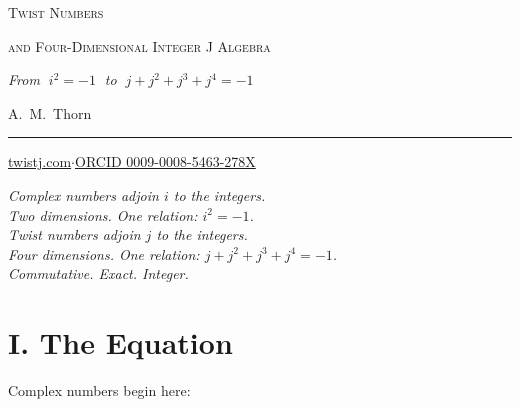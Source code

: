 \documentclass[11pt, a4paper]{article}
\begin{document}
\begin{center}
\vspace*{0.3cm}

{\huge\scshape Twist Numbers}

\vspace{0.2em}

{\LARGE\scshape and Four-Dimensional Integer J Algebra}

\vspace{0.3em}

{\Large\itshape From $\;i^2 = -1\;$ to $\;j + j^2 + j^3 + j^4 = -1$}

\vspace{1em}

{\large A.\ M.\ Thorn}

\vspace{0.5em}

\rule{0.3\textwidth}{0.4pt}

\vspace{0.3em}

{\small \href{https://twistj.com}{twistj.com}\quad$\cdot$\quad \href{https://orcid.org/0009-0008-5463-278X}{ORCID 0009-0008-5463-278X}}

\end{center}

\vspace{0.5em}

\begin{center}
\textit{Complex numbers adjoin $i$ to the integers.}\\[0.2em]
\textit{Two dimensions. One relation: $i^2 = -1$.}\\[0.4em]
\textit{Twist numbers adjoin $j$ to the integers.}\\[0.2em]
\textit{Four dimensions. One relation: $j + j^2 + j^3 + j^4 = -1$.}\\[0.4em]
\textit{Commutative. Exact. Integer.}
\end{center}

\vspace{1em}

\section*{I. The Equation}

Complex numbers begin here:
\end{document}
